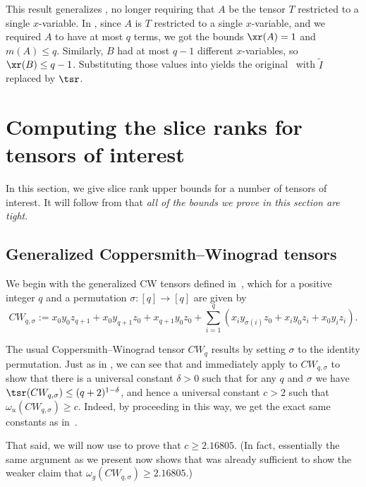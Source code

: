 \documentclass{toc}
\begin{document}
\begin{remark}
This result generalizes \cite[Theorem~5.1]{aw}, no longer requiring that $A$ be the tensor $T$ restricted to a single $x$-variable. In \cite[Theorem~5.1]{aw}, since $A$ is $T$ restricted to a  single $x$-variable, and we required $A$ to have at most $q$ terms, we got the bounds $\xr(A) = 1$ and $m(A) \leq q$. Similarly, $B$ had at most $q-1$ different $x$-variables, so $\xr(B) \leq q-1$. Substituting those values into  yields the original~\cite[Theorem~5.1]{aw} with $\tilde{I}$ replaced by $\tsr$. 
\end{remark}





%
\section{Computing the slice ranks for tensors of interest} \label{secfour}

In this section, we give slice rank upper bounds for a number of tensors of interest. It will follow from  that \emph{all of the bounds we prove in this section are tight}.

%
\subsection{Generalized Coppersmith--Winograd tensors} \label{secgcw}

We begin with the generalized CW tensors defined in~\cite{aw}, which for a positive integer $q$ and a permutation $\sigma : [q] \to [q]$ are given by
$$CW_{q,\sigma} := x_0 y_0 z_{q+1} + x_0 y_{q+1} z_0 + x_{q+1} y_0 z_0 + \sum_{i=1}^q (x_i y_{\sigma(i)} z_0 + x_i y_0 z_i + x_0 y_i z_i).$$

The usual Coppersmith--Winograd tensor $CW_q$ results by setting $\sigma$ to the identity permutation. Just as in \cite[Section~7.1]{aw}, we can see that  and  immediately apply to $CW_{q,\sigma}$ to show that there is a universal constant $\delta>0$ such that for any $q$ and $\sigma$ we have $\tsr(CW_{q,\sigma}) \leq (q+2)^{1-\delta}$, and hence a universal constant $c>2$ such that $\omega_u(CW_{q,\sigma}) \geq c$. Indeed, by proceeding in this way, we get the exact same constants as in~\cite{aw}.

That said, we will now use  to prove that $c \geq 2.16805$. (In fact, essentially the same argument as we present now shows that \cite[Theorem 5.2]{aw} was already sufficient to show the weaker claim that $\omega_g(CW_{q,\sigma}) \geq 2.16805$.)
\end{document}
